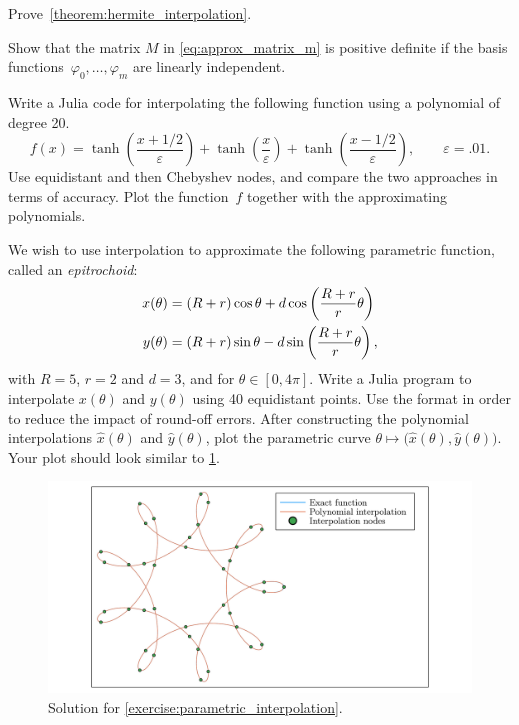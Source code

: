 \begin{exercise}
    \label{exercise:proof_hermite}
    Prove~\cref{theorem:hermite_interpolation}.
\end{exercise}

\begin{exercise}
    \label{exercise:matrix_approx}
    Show that the matrix $M$ in \eqref{eq:approx_matrix_m} is positive definite
    if the basis functions~$\varphi_0, \dotsc, \varphi_m$ are linearly independent.
\end{exercise}

\begin{compexercise}
    Write a Julia code for interpolating the following function using a polynomial of degree 20.
    \[
        f(x) = \tanh\left(\frac{x+1/2}{\varepsilon}\right) + \tanh\left(\frac{x}{\varepsilon}\right) + \tanh\left(\frac{x-1/2}{\varepsilon}\right),
        \qquad \varepsilon = .01.
    \]
    Use equidistant and then Chebyshev nodes,
    and compare the two approaches in terms of accuracy.
    Plot the function~$f$ together with the approximating polynomials.
\end{compexercise}

\begin{compexercise}
    \label{exercise:parametric_interpolation}
    We wish to use interpolation to approximate the following parametric function,
    called an \emph{epitrochoid}:
    \begin{align}
      x (\theta) &= (R + r)\cos\theta + d\cos\left({R + r \over r}\theta\right) \\
      y (\theta) &= (R + r)\sin\theta - d\sin\left({R + r \over r}\theta\right),
    \end{align}
    with $R = 5$, $r = 2$ and $d = 3$, and for $\theta \in [0, 4\pi]$.
    Write a Julia program to interpolate $x(\theta)$ and $y(\theta)$ using 40 equidistant points.
    Use the  format in order to reduce the impact of round-off errors.
    After constructing the polynomial interpolations $\widehat x(\theta)$ and $\widehat y(\theta)$,
    plot the parametric curve $\theta \mapsto \bigl(\widehat x(\theta), \widehat y(\theta)\bigr)$.
    Your plot should look similar to \cref{fig:parametric_interpolation}.
    \begin{figure}[ht]
        \centering
        \includegraphics[width=0.99\linewidth]{figures/interpolation.pdf}
        \caption{Solution for \cref{exercise:parametric_interpolation}.}%
        \label{fig:parametric_interpolation}
    \end{figure}
\end{compexercise}

